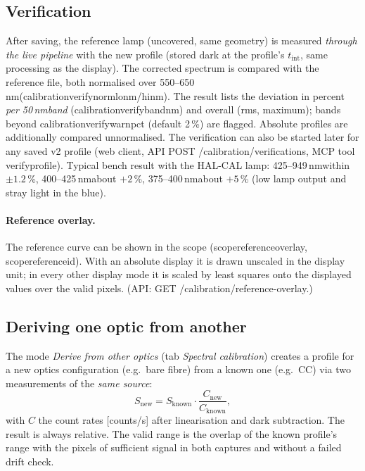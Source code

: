 \documentclass[12pt,a4paper]{article}
\DeclareRobustCommand{\code}[1]{{\ttfamily\small\def\_{\rawus\allowbreak}#1}}
\DeclareRobustCommand{\key}[1]{{\ttfamily\small\color{acc2}\def\_{\rawus\allowbreak}#1}}
\newcommand{\nm}{\,nm}
\begin{document}
\subsection{Verification}\label{sec:speccal-verify}
After saving, the reference lamp (uncovered, same geometry) is measured
\emph{through the live pipeline} with the new profile (stored dark at the
profile's $t_{\mathrm{int}}$, same processing as the display). The corrected
spectrum is compared with the reference file, both normalised over
550--650\nm (\key{calibration\_verify\_norm\_lo\_nm/hi\_nm}). The result lists the
deviation in percent \emph{per 50\nm band} (\key{calibration\_verify\_band\_nm})
and overall (rms, maximum); bands beyond \key{calibration\_verify\_warn\_pct}
(default 2\,\%) are flagged. Absolute profiles are additionally compared
unnormalised. The verification can also be started later for any saved v2 profile
(web client, API \code{POST /calibration/verifications},
MCP tool \code{verify\_profile}). Typical bench result with the HAL-CAL lamp:
425--949\nm within $\pm1.2$\,\%, 400--425\nm about $+2$\,\%, 375--400\nm about
$+5$\,\% (low lamp output and stray light in the blue).

\paragraph{Reference overlay.} The reference curve can be shown in the scope
(\key{scope\_reference\_overlay}, \key{scope\_reference\_id}). With an absolute
display it is drawn unscaled in the display unit; in every other display mode it
is scaled by least squares onto the displayed values over the valid pixels.
(API: \code{GET /calibration/reference-overlay}.)

\subsection{Deriving one optic from another}\label{sec:speccal-derive}
The mode \emph{Derive from other optics} (tab \emph{Spectral calibration})
creates a profile for a new optics configuration (e.g.\ bare fibre) from a known
one (e.g.\ CC) via two measurements of the \emph{same source}:
\[
  S_{\mathrm{new}} = S_{\mathrm{known}}\cdot\frac{C_{\mathrm{new}}}{C_{\mathrm{known}}} ,
\]
with $C$ the count rates [counts/s] after linearisation and dark subtraction.
The result is always relative. The valid range is the overlap of the known
profile's range with the pixels of sufficient signal in both captures and
without a failed drift check.
\end{document}
